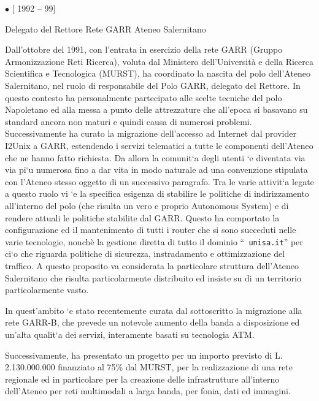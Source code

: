 \documentclass[11pt]{article}
\newlength{\posii}
\newlength{\posiibox}
\newlength{\boxsize}
\begin{document}
\begin{description}
\item \parbox[t]{\posiibox}
{\bf  \raggedright $ \bullet $ [ 1992 -- 99] \par
\medskip
Delegato del Rettore Rete GARR Ateneo Salernitano}
\hfill \parbox[t]{\boxsize} {
Dall'ottobre del 1991, con l'entrata in esercizio della rete GARR
(Gruppo Armonizzazione Reti Ricerca), voluta dal Ministero
dell'Universit\`a e della Ricerca Scientifica e Tecnologica (MURST),
ha coordinato la nascita del polo dell'Ateneo Salernitano, nel ruolo
di responsabile del Polo GARR, delegato del Rettore.  In questo
contesto ha personalmente partecipato alle scelte tecniche del polo
Napoletano ed alla messa a punto delle attrezzature che all'epoca si
basavano su standard ancora non maturi e quindi causa di numerosi
problemi.  Successivamente ha curato la migrazione dell'accesso ad
Internet dal provider I2Unix a GARR, estendendo i servizi telematici a
tutte le componenti dell'Ateneo che ne hanno fatto richiesta.  Da
allora la comunit\a`a degli utenti \a`e diventata via via pi\a`u
numerosa fino a dar vita in modo naturale ad una convenzione stipulata
con l'Ateneo stesso oggetto di un successivo paragrafo.  Tra le varie
attivit\a`a legate a questo ruolo vi \a`e la specifica esigenza di
stabilire le politiche di indirizzamento all'interno del polo (che
risulta un vero e proprio Autonomous System) e di rendere attuali le
politiche stabilite dal GARR. Questo ha comportato la configurazione
ed il mantenimento di tutti i router che si sono succeduti nelle varie
tecnologie, nonch\`e la gestione diretta di tutto il dominio ``{\tt
unisa.it}'' per ci\a`o che riguarda politiche di sicurezza,
instradamento e ottimizzazione del traffico. A questo proposito va
considerata la particolare struttura dell'Ateneo Salernitano che
risulta particolarmente distribuito ed insiste su di un territorio
particolarmente vasto.

In quest'ambito \a`e stato recentemente curata dal sottoscritto la migrazione
alla rete GARR-B, che prevede un notevole aumento della banda a disposizione
ed un'alta qualit\a`a dei servizi, interamente basati su tecnologia ATM.

Successivamente, ha presentato un progetto per un importo previsto di
L. 2.130.000.000 finanziato al 75\% dal MURST, per la realizzazione di
una rete regionale ed in particolare per la creazione delle
infrastrutture all'interno dell'Ateneo per reti multimodali a larga
banda, per fonia, dati ed immagini.  }


\end{description}
\end{document}
